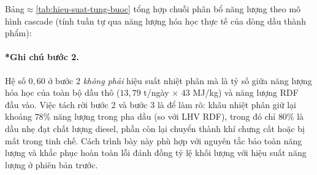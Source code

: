 \documentclass[../main.tex]{subfiles}
\begin{document}
Bảng$\approx$\ref{tab:hieu-suat-tung-buoc} tổng hợp chuỗi phân bổ năng lượng theo mô hình cascade (tính tuần tự qua năng lượng hóa học thực tế của dòng dầu thành phẩm):

\begin{table}[htbp]
\centering
\caption{Chuỗi cascade hiệu suất: $\eta_{\text{cascade}}$ theo các bước năng lượng (mô hình cascade)}
\label{tab:hieu-suat-tung-buoc}
\setlength{\tabcolsep}{5pt}
\end{table}

\paragraph*{*Ghi chú bước 2.} Hệ số $0{,}60$ ở bước 2 \emph{không phải} hiệu suất nhiệt phân mà là tỷ số giữa năng lượng hóa học của toàn bộ dầu thô ($13{,}79$ t/ngày $\times$ 43 MJ/kg) và năng lượng RDF đầu vào. Việc tách rời bước 2 và bước 3 là để làm rõ: khâu nhiệt phân giữ lại khoảng $78\%$ năng lượng trong pha dầu (so với LHV RDF), trong đó chỉ $80\%$ là dầu nhẹ đạt chất lượng diesel, phần còn lại chuyển thành khí chưng cất hoặc bị mất trong tinh chế. Cách trình bày này phù hợp với nguyên tắc bảo toàn năng lượng và khắc phục hoàn toàn lỗi đánh đồng tỷ lệ khối lượng với hiệu suất năng lượng ở phiên bản trước.
\end{document}
